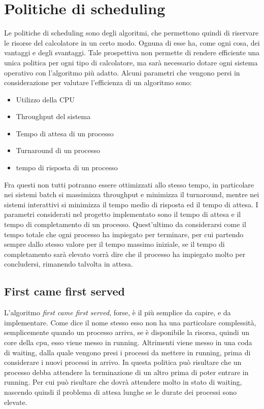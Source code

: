 \documentclass[Lau, oneside]{sapthesis}%
\begin{document}
\section{Politiche di scheduling}
\label{sec:politiche}
Le politiche di scheduling sono degli algoritmi, che permettono quindi di riservare le risorse del calcolatore in un certo modo.
Ognuna di esse ha, come ogni cosa, dei vantaggi e degli svantaggi.
Tale prospettiva non permette di rendere efficiente una unica politica per ogni tipo di calcolatore, ma sarà necessario dotare ogni sistema operativo con l'algoritmo più adatto.
Alcuni parametri che vengono persi in considerazione per valutare l'efficienza di un algoritmo sono:
\begin{itemize}
\item Utilizzo della CPU
\item Throughput del sistema
\item Tempo di attesa di un processo
\item Turnaround di un processo
\item tempo di risposta di un processo
\end{itemize}
Fra questi non tutti potranno essere ottimizzati allo stesso tempo, in particolare nei sistemi batch si massimizza throughput e minimizza il turnaround, mentre nei sistemi interattivi si minimizza il tempo medio di risposta ed il tempo di attesa.
I parametri considerati nel progetto implementato sono il tempo di attesa e il tempo di completamento di un processo.
Quest'ultimo da considerarsi come il tempo totale che ogni processo ha impiegato per terminare, per cui partendo sempre dallo stesso valore per il tempo massimo iniziale, se il tempo di completamento sarà elevato vorrà dire che il processo ha impiegato molto per concludersi, rimanendo talvolta in attesa.

\subsection{First came first served}
\label{subsec:fcfs}
L'algoritmo \textit{first came first served}, forse, è il più semplice da capire, e da implementare.
Come dice il nome stesso esso non ha una particolare complessità, semplicemente quando un processo arriva, se è disponibile la risorsa, quindi un core della cpu, esso viene messo in running.
Altrimenti viene messo in una coda di waiting, dalla quale vengono presi i processi da mettere in running, prima di considerare i nuovi processi in arrivo.
In questa politica può risultare che un processo debba attendere la terminazione di un altro prima di poter entrare in running.
Per cui può risultare che dovrà attendere molto in stato di waiting, nascendo quindi il problema di attesa lunghe se le durate dei processi sono elevate.
\end{document}
